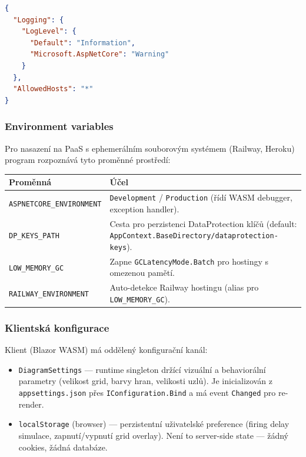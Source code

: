 \documentclass[12pt,a4paper]{article}
\begin{document}
\begin{lstlisting}[language=json]
{
  "Logging": {
    "LogLevel": {
      "Default": "Information",
      "Microsoft.AspNetCore": "Warning"
    }
  },
  "AllowedHosts": "*"
}
\end{lstlisting}

\subsubsection{Environment variables}

Pro nasazení na PaaS s ephemerálním souborovým systémem (Railway, Heroku)
program rozpoznává tyto proměnné prostředí:

\begin{longtable}{p{4.5cm}p{8.5cm}}
    \toprule
    \textbf{Proměnná} & \textbf{Účel} \\
    \midrule
    \endhead
    \texttt{ASPNETCORE\_ENVIRONMENT}    & \texttt{Development} / \texttt{Production} (řídí WASM debugger, exception handler). \\
    \texttt{DP\_KEYS\_PATH}             & Cesta pro perzistenci DataProtection klíčů (default: \texttt{AppContext.BaseDirectory/dataprotection-keys}). \\
    \texttt{LOW\_MEMORY\_GC}            & Zapne \texttt{GCLatencyMode.Batch} pro hostingy s omezenou pamětí. \\
    \texttt{RAILWAY\_ENVIRONMENT}       & Auto-detekce Railway hostingu (alias pro \texttt{LOW\_MEMORY\_GC}). \\
    \bottomrule
\end{longtable}

\subsubsection{Klientská konfigurace}

Klient (Blazor WASM) má oddělený konfigurační kanál:

\begin{itemize}
    \item \texttt{DiagramSettings} — runtime singleton držící vizuální
          a behaviorální parametry (velikost grid, barvy hran, velikosti
          uzlů). Je inicializován z \texttt{appsettings.json} přes
          \texttt{IConfiguration.Bind} a má event \texttt{Changed}
          pro re-render.
    \item \texttt{localStorage} (browser) — perzistentní uživatelské
          preference (firing delay simulace, zapnutí/vypnutí grid
          overlay). Není to server-side state — žádný cookies,
          žádná databáze.
\end{itemize}
\end{document}
